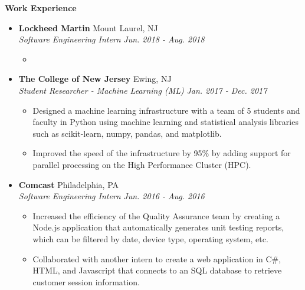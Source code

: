 \documentclass[letterpaper,10pt]{article}
\newcommand{\resitem}[1]{\item #1 \vspace{-2pt}}
\newcommand{\resheading}[1]{{\large \colorbox{mygrey}{\begin{minipage}{\textwidth}{\textbf{#1 \vphantom{p\^{E}}}}\end{minipage}}}}
\newcommand{\ressubheading}[4]{%
  \item\textbf{#1} \hfill #2\null\\
  \textit{#3} \hfill \textit{#4}%
  \vspace{-5pt}
}%
\begin{document}
\resheading{Work Experience}
\begin{itemize}
\ressubheading{Lockheed Martin}{Mount Laurel, NJ}{Software Engineering Intern}{Jun. 2018 - Aug. 2018}
	\begin{itemize}
		\resitem{}
		\end{itemize}	

\ressubheading{The College of New Jersey}{Ewing, NJ}{Student Researcher - Machine Learning (ML)}{Jan. 2017 - Dec. 2017}
	\begin{itemize}
		\resitem{Designed a machine learning infrastructure with a team of 5 students and faculty in Python using machine learning and statistical analysis libraries such as scikit-learn, numpy, pandas, and matplotlib.}
		\resitem{Improved the speed of the infrastructure by 95\% by adding support for parallel processing on the High Performance Cluster (HPC).}
		\end{itemize}

\ressubheading{Comcast}{Philadelphia, PA}{Software Engineering Intern}{Jun. 2016 - Aug. 2016}
	\begin{itemize}
		\resitem{Increased the efficiency of the Quality Assurance team by creating a Node.js application that automatically generates unit testing reports, which can be filtered by date, device type, operating system, etc.}
		\resitem{Collaborated with another intern to create a web application in C\#, HTML, and Javascript that connects to an SQL database to retrieve customer session information.}
	\end{itemize}
\end{itemize}
\end{document}
